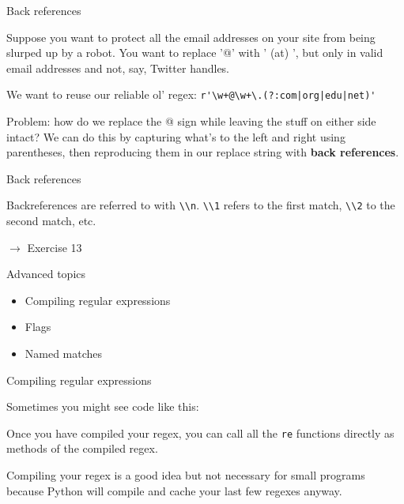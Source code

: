 \documentclass{beamer}
\begin{document}
\begin{frame}{Back references}

Suppose you want to protect all the email addresses
on your site from being slurped up by a robot. You
want to replace '@' with ' (at) ', but only in valid email
addresses and not, say, Twitter handles.

\bigskip

We want to reuse our reliable ol' regex: \lstinline$r'\w+@\w+\.(?:com|org|edu|net)'$

\bigskip

Problem: how do we replace the @ sign while leaving the stuff
on either side intact? We can do this by capturing what's to the left and right using parentheses,
then reproducing them in our replace string with {\bf back references}.

\end{frame}

\begin{frame}{Back references}

Backreferences are referred to with \lstinline$\\n$. \lstinline$\\1$
refers to the first match, \lstinline$\\2$ to the second match, etc.




\bigskip

$\rightarrow$ Exercise 13


\end{frame}

\begin{frame}{Advanced topics}

\begin{itemize}
 \item Compiling regular expressions
 \item Flags
 \item Named matches
\end{itemize}

\end{frame}

\begin{frame}{Compiling regular expressions}

Sometimes you might see code like this:



{\small Once you have compiled your regex, you can call all the \lstinline$re$ functions
directly as methods of the compiled regex. }

\bigskip

{\small Compiling your regex is a good idea but not necessary for small
programs because Python will compile and cache your last few regexes anyway.}

\end{frame}
\end{document}
